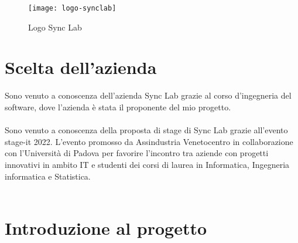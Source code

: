 \begin{figure}[H]
    \centering
    \texttt{[image: logo-synclab]}
    \caption{Logo Sync Lab}
\end{figure}

\section{Scelta dell'azienda}
Sono venuto a conoscenza dell'azienda Sync Lab grazie al corso d'ingegneria del
software, dove l'azienda è stata il proponente del mio progetto.
\\\\
Sono venuto a conoscenza della proposta di stage di Sync Lab grazie all'evento stage-it 2022. 
L’evento promosso da Assindustria Venetocentro in collaborazione con l’Università 
di Padova per favorire l’incontro tra aziende con progetti innovativi in ambito \gls{IT} e 
studenti dei corsi di laurea in Informatica, Ingegneria informatica e Statistica.
\\\\


\section{Introduzione al progetto}

